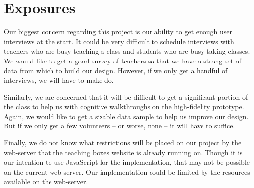 \documentclass[11pt,letter]{article}
\begin{document}
\section{Exposures}
Our biggest concern regarding this project is our ability to get enough user
interviews at the start. It could be very difficult to schedule interviews with
teachers who are busy teaching a class and students who are busy taking classes.
We would like to get a good survey of teachers so that we have a strong set of
data from which to build our design. However, if we only get a handful of
interviews, we will have to make do.

Similarly, we are concerned that it will be difficult to get a significant
portion of the class to help us with cognitive walkthroughs on the high-fidelity
prototype. Again, we would like to get a sizable data sample to help us improve
our design. But if we only get a few volunteers -- or worse, none -- it will
have to suffice.

Finally, we do not know what restrictions will be placed on our project by the
web-server that the teaching boxes website is already running on. Though it is
our intention to use JavaScript for the implementation, that may not be possible
on the current web-server. Our implementation could be limited by the resources
available on the web-server.
\end{document}
